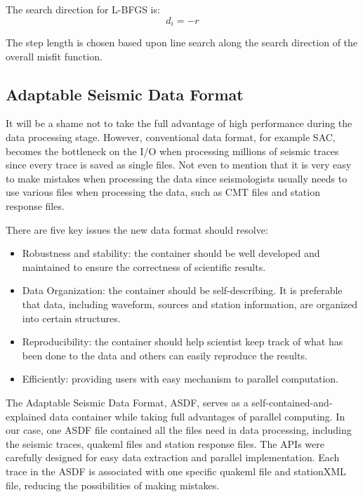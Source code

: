 \documentclass[extra,mreferee]{gji}
\begin{document}
The search direction for L-BFGS is:
$$d_i = -r$$

The step length is chosen based upon line search along the search direction of the overall misfit function.

\subsection{Adaptable Seismic Data Format}

It will be a shame not to take the full advantage of high performance during the data processing stage. However, conventional data format, for example SAC, becomes the bottleneck on the I/O when processing millions of seismic traces since every trace is saved as single files. Not even to mention that it is very easy to make mistakes when processing the data since seismologists usually needs to use various files when processing the data, such as CMT files and station response files.

There are five key issues the new data format should resolve:
\begin{itemize}
    \item Robustness and stability: the container should be well developed and maintained to ensure the correctness of scientific results.
    \item Data Organization: the container should be self-describing. It is preferable that data, including waveform, sources and station information, are organized into certain structures.
    \item Reproducibility: the container should help scientist keep track of what has been done to the data and others can easily reproduce the results.
    \item Efficiently: providing users with easy mechanism to parallel computation.

\end{itemize}

The Adaptable Seismic Data Format, ASDF, serves as a self-contained-and-explained data container while taking full advantages of parallel computing. In our case, one ASDF file contained all the files need in data processing, including the seismic traces, quakeml files and station response files. The APIs were carefully designed for easy data extraction and parallel implementation. Each trace in the ASDF is associated with one specific quakeml file and stationXML file, reducing the possibilities of making mistakes.

\citep{krischer2016adaptable}
\end{document}
